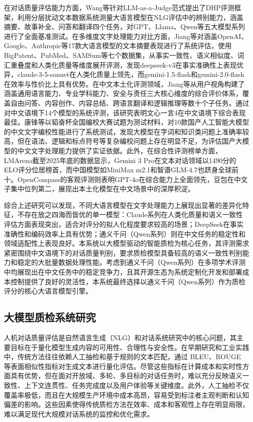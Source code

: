 在对话质量评估能力方面，Wang等针对LLM-as-a-Judge范式提出了DHP评测框架，利用分层扰动文本数据系统测量大语言模型在NLG评估中的辨别能力\cite{wang-etal-2025-dhp}，涵盖摘要、故事补全、问答和翻译四个任务，对GPT、Llama、Qwen等五大模型系列进行了全面基准测试。在多维度文字处理能力对比方面，Jiang等对涵盖OpenAI、Google、Anthropic等17款大语言模型的文本摘要表现进行了系统评估，使用BigPatent、PubMed、SAMSum等七个数据集，从事实一致性、语义相似度、词汇重叠度和人类化质量等维度展开评测，发现deepseek-v3在事实准确性上表现优异，claude-3-5-sonnet在人类化质量上领先，而gemini-1.5-flash和gemini-2.0-flash在效率与性价比上具有优势\cite{janakiraman2025empiricalcomparisontextsummarization}。在中文本土化评测领域，Jiang等从用户视角构建了涵盖通用语言能力、专业学科能力、安全与责任三大核心维度的综合评价体系，覆盖自由问答、内容创作、内容总结、跨语言翻译和逻辑推理等数十个子任务。通过对中文语境下14个模型的系统评测，该研究表明文心一言4在中文语境下综合表现最佳。康锋等以韬奋杯全国编校大赛试题为测试材料，对10款国产人工智能大模型的中文文字编校性能进行了系统测试，发现大模型在字词和知识类问题上准确率较高，但在语法、逻辑和标点符号等复杂编校问题上存在明显不足，为评估国产大模型的中文文字处理能力提供了实证依据。此外，在综合性评测榜单方面，LMArena截至2025年底的数据显示，Gemini 3 Pro在文本对话领域以1490分的ELO评分位居榜首，而中国模型如MiniMax m2.1和智谱GLM-4.7也跻身全球前十。OpenCompass的客观评测则表明GPT-4o在综合能力上全面领先，豆包在中文子集中位列第二，展现出本土化模型在中文场景中的深厚积淀。

综合上述研究可以发现，不同大语言模型在文字处理能力上展现出显著的差异化特征，不存在放之四海而皆优的单一模型：Claude系列在人类化质量和语义一致性评估方面表现突出，适合对评分的拟人化程度要求较高的场景；DeepSeek在事实准确性和编码效率上具有优势；通义千问（Qwen系列）则在中文任务的稳定性和领域适配性上表现良好。本系统以大模型驱动的智能质检为核心任务，其评测需求紧密围绕中文语境下的对话质量判别，要求质检模型具备较高的语义一致性判别能力和稳定的大批量数据处理性能。考虑到通义千问（Qwen系列）在多项学术评测中均展现出在中文任务中的稳定竞争力，且其开源生态为系统定制化开发和部署成本控制提供了良好的灵活性，本系统最终选择以通义千问（Qwen系列）作为质检评分的核心大语言模型引擎。
\subsection{大模型质检系统研究}
人机对话质量评估是自然语言生成（NLG）和对话系统研究中的核心问题，其主要目标在于量化模型生成内容的可用性、合理性与安全性。在早期研究和工业实践中，传统方法往往依赖人工抽检和基于规则的文本匹配，通过 BLEU、ROUGE 等表面相似性指标对生成文本进行量化评估\cite{10.3115/1073083.1073135,10.3115/1218955.1219032}。尽管这些指标在计算成本和实时性方面具有优势，但在面对开放域、多轮、多目标的对话任务时，难以充分反映语义一致性、上下文连贯性、任务完成度以及用户体验等关键维度。此外，人工抽检不仅覆盖率极低，而且在大规模生产环境中成本高昂，容易受到标注者主观判断和认知偏差的影响。这些因素使得传统质检方法在效率、成本和客观性上存在明显局限，难以满足现代大规模对话系统的监控和优化需求。

